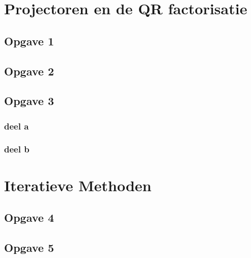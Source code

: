 \documentclass[een]{practicumverslag}
\begin{document}
         
\maketitlepage


\pagebreak

\section{Projectoren en de QR factorisatie}

\subsection*{Opgave 1}

\lipsum[3-3]

\subsection*{Opgave 2}

\lipsum[7-7]

\subsection*{Opgave 3}

\subsubsection{deel a}

\lipsum[8-8]

\subsubsection{deel b}

\lipsum[9-9]

\section{Iteratieve Methoden}

\subsection*{Opgave 4}

\lipsum[3-3]

\subsection*{Opgave 5}
\end{document}
